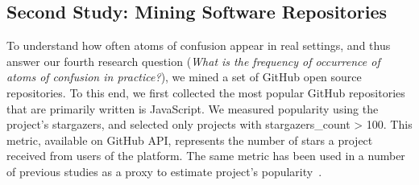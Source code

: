     
    
\subsection{Second Study: Mining Software Repositories}

To understand how often atoms of confusion appear in real settings, and thus answer our fourth research question (\emph{What is the frequency of occurrence of atoms of confusion in practice?}), we mined a set of GitHub open source repositories. To this end, we first collected the most popular GitHub repositories that are primarily written is JavaScript. We measured popularity using the project's stargazers, and selected only projects with stargazers\_count > 100. This metric, available on  GitHub API, represents the number of stars a project received from users of the platform. The same metric has been used in a number of previous studies as a proxy to estimate project's popularity~\cite{gyimesi2019bugsjs}.

